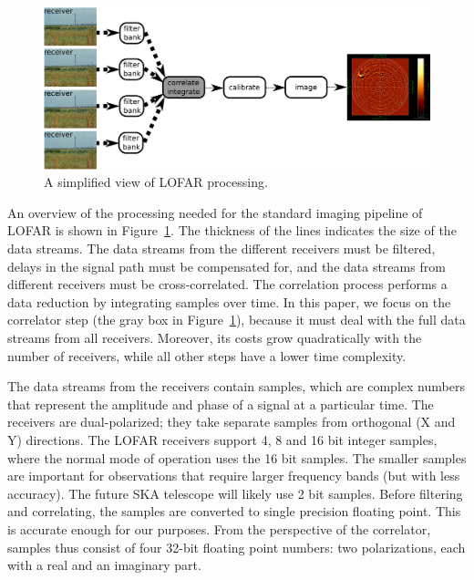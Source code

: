\documentclass{article}
\begin{document}
\begin{figure}[t]
\begin{center}
\includegraphics[width=12cm]{figures/processing-overview.pdf}
\end{center}
\vspace{-0.5cm}
\caption{A simplified view of LOFAR processing.}
\label{fig-processing-overview}
\end{figure}

An overview of the processing needed for the standard imaging pipeline
of LOFAR is shown in Figure~\ref{fig-processing-overview}.  The
thickness of the lines indicates the size of the data streams.  The
data streams from the different receivers must be filtered, delays in
the signal path must be compensated for, and the data streams from
different receivers must be cross-correlated. The correlation process
performs a data reduction by integrating samples over time.  In this
paper, we focus on the correlator step (the gray box in
Figure~\ref{fig-processing-overview}), because it must deal with the full data streams
from all receivers. Moreover, its costs grow
quadratically with the number of receivers, while all other steps have a
lower time complexity.  

The data streams from the receivers contain samples, which are complex
numbers that represent the amplitude and phase of a signal at a
particular time.  The receivers are dual-polarized; they take separate
samples from orthogonal (X and Y) directions.  The LOFAR receivers
support 4, 8 and 16 bit integer samples, where the normal mode of
operation uses the 16 bit samples. The smaller samples are important
for observations that require larger frequency bands (but with less accuracy).
The future SKA telescope will
likely use 2 bit samples.  Before filtering and correlating, the
samples are converted to single precision floating point.  This is
accurate enough for our purposes. From the perspective of the
correlator, samples thus consist of four 32-bit floating point
numbers: two polarizations, each with a real and an imaginary part.
\end{document}
